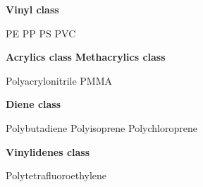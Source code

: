 \documentclass[a4paper, 11pt]{article}
\begin{document}
\begin{center}
\chemname
{}
{\textbf{Vinyl class}} 
\end{center}
\qquad
\begin{center}
\chemname
{}
{PE}
\qquad 
\chemname
{}
{PP}
\qquad
\chemname
{}
{PS}
\qquad 
\chemname
{}
{PVC}
\end{center}

\qquad

\begin{center}
\chemname
{}
{\textbf{Acrylics class}} \qquad 
\chemname
{}
{\textbf{Methacrylics class}} \qquad 
\end{center}
\qquad 
\begin{center}
\chemname
{}
{Polyacrylonitrile}
\qquad
\chemname
{}
{PMMA}
\end{center}

\qquad

\begin{center}
\chemname
{}
{\textbf{Diene class}}
\end{center}
\qquad 
\begin{center}
\chemname
{}
{{Polybutadiene}} \qquad 
\chemname
{}
{{Polyisoprene}} \qquad 
\chemname
{}
{{Polychloroprene}} \qquad 
\end{center}

\newpage

\begin{center}
\chemname
{}
{\textbf{Vinylidenes class}}
\end{center}
\qquad 
\begin{center}
\chemname
{}
{{Polytetrafluoroethylene}} \qquad 
\end{center}
\end{document}
